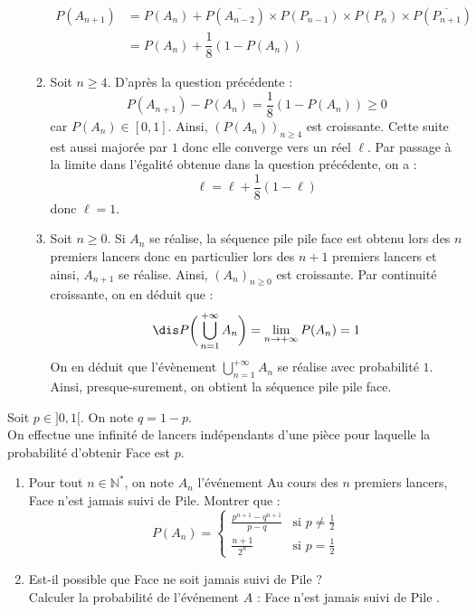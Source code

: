 \documentclass[a4paper,10pt]{report}
\begin{document}
\begin{enumerate}
\begin{enumerate}
\begin{align*}
P(A_{n+1}) & = P(A_n) +   P(\overline{A_{n-2}}) \times P( P_{n-1}) \times P(P_n) \times P(\overline{P_{n+1}}) \\
& = P(A_n) + \dfrac{1}{8} (1-P(A_n))
\end{align*}
\item Soit $n \geq 4$. D'après la question précédente :
$$ P(A_{n+1})-P(A_n)= \dfrac{1}{8} (1-P(A_n)) \geq 0$$
car $P(A_n) \in [0,1]$. Ainsi, $(P(A_n))_{n \geq 4}$ est croissante. Cette suite est aussi majorée par $1$ donc elle converge vers un réel $\ell$. Par passage à la limite dans l'égalité obtenue dans la question précédente, on a :
$$ \ell = \ell + \dfrac{1}{8}(1- \ell)$$
donc $\ell =1$.
\item Soit $n \geq 0$. Si $A_{n}$ se réalise, la séquence pile pile face est obtenu lors des $n$ premiers lancers donc en particulier lors des $n+1$ premiers lancers et ainsi, $A_{n+1}$ se réalise. Ainsi, $(A_n)_{n \geq 0}$ est croissante. Par continuité croissante, on en déduit que :
$$\dis P \bigg{(} \bigcup_{n=1}^{+  \infty} A_n \bigg{)} = \lim_{n \rightarrow + \infty} P(A_n) = 1$$
On en déduit que l'évènement $\bigcup_{n=1}^{+  \infty} A_n $ se réalise avec probabilité $1$. Ainsi, presque-surement, on obtient la séquence pile pile face.
\end{enumerate}
\end{enumerate}

\begin{Exercice}{}
Soit $p \in ]0,1[$. On note $q=1-p$.\\
On effectue une infinité de lancers indépendants d'une pièce pour laquelle la probabilité d'obtenir Face est $p$.
\begin{enumerate}
\item Pour tout $n \in \mathbb{N}^*$, on note $A_n$ l'événement \og Au cours des $n$ premiers lancers, Face n'est jamais suivi de Pile\fg.
Montrer que :
$$P(A_n)=\begin{cases}
{\frac{p^{n+1}-q^{n+1}}{p-q}} & \text{si } p \neq \frac 1 2\\
{\frac{n+1}{2^n}} & \text{si } p=\frac 1 2
\end{cases}$$
\item Est-il possible que Face ne soit jamais suivi de Pile ?\\
Calculer la probabilité de l'événement $A$ : \og Face n'est jamais suivi de Pile \fg.
\end{enumerate}
\end{Exercice}
\end{document}
